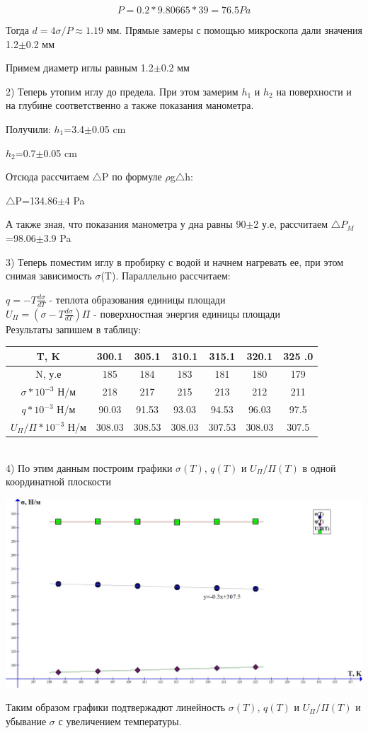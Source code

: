 \documentclass[a4paper,12pt]{article} %
\begin{document}
$$P=0.2*9.80665*39=76.5 Pa$$

Тогда $d=4\sigma/P\approx 1.19$ мм. Прямые замеры с помощью микроскопа дали значения 1.2$\pm$0.2 мм 

Примем диаметр иглы равным 1.2$\pm$0.2 мм

2) Теперь утопим иглу до предела. При этом замерим $h_1$ и $h_2$ на поверхности и на глубине соответственно а также показания манометра.

Получили:
$h_1$=3.4$\pm$0.05 cm

$h_2$=0.7$\pm$0.05 cm

Отсюда рассчитаем $\triangle$P по формуле $\rho$g$\triangle$h:

$\triangle$P=134.86$\pm$4 Pa

А также зная, что показания манометра у дна равны 90$\pm$2 у.е, рассчитаем  $\triangle$$P_M$=98.06$\pm$3.9 Pa

3) Теперь поместим иглу в пробирку с водой и начнем нагревать ее, при этом снимая зависимость $\sigma$(T). Параллельно рассчитаем:

$q=-T\frac{d\sigma}{dT}$ - теплота образования единицы площади \\

$U_\Pi = (\sigma-T\frac{d\sigma}{dT})\Pi$ - поверхностная энергия единицы площади\\

Результаты запишем в таблицу:

\begin{tabular}{|c|c|c|c|c|c|c|}
\hline 
T, K & 300.1 & 305.1 & 310.1 & 315.1 & 320.1 & 325	.0 \\ 
\hline 
N, у.е & 185 & 184 & 183 & 181 & 180 & 179 \\ 
\hline 
$\sigma*10^{-3}$ Н/м  & 218 & 217 & 215 & 213 & 212 & 211 \\ 
\hline 
$q*10^{-3}$ Н/м  & 90.03 & 91.53 & 93.03 & 94.53 & 96.03 & 97.5 \\ 
\hline 
$U_\Pi / \Pi*10^{-3}$ Н/м & 308.03 & 308.53 & 308.03 & 307.53 & 308.03 & 307.5 \\ 
\hline 
\end{tabular} \\

4) По этим данным построим графики $\sigma (T)$, $q (T)$ и $U_\Pi/\Pi (T)$ в одной координатной плоскости

\includegraphics[scale=0.34]{2511}


Таким образом графики подтвержадют линейность $\sigma (T)$, $q (T)$ и $U_\Pi/\Pi (T)$ и убывание $\sigma$ с увеличением температуры.
\end{document}
